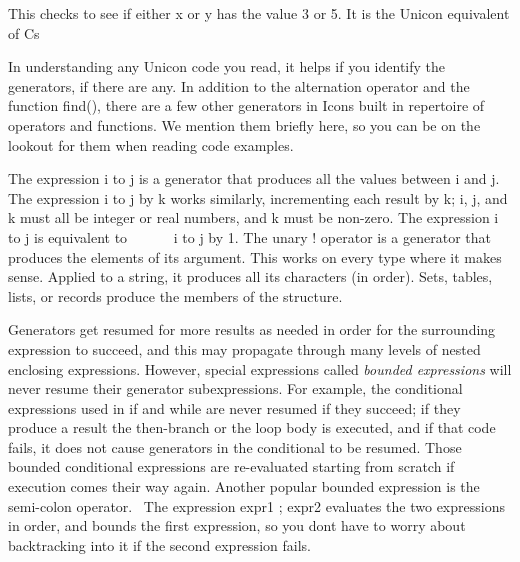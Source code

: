 
This checks to see if either \textsf{x} or \textsf{y} has the value 3 or
5. It is the Unicon equivalent of C{\textquotesingle}s


In understanding any Unicon code you read, it helps if you identify the
generators, if there are any. In addition to the alternation operator
\textsf{{\textbar}} and the function \textsf{find()}, there are a few
other generators in Icon{\textquotesingle}s built in repertoire of
operators and functions. We mention them briefly here, so you can be on
the lookout for them when reading code examples.

The expression \textsf{i }\textsf{to j} is a
generator that produces all the values between \textsf{i} and
\textsf{j.} The expression \textsf{i to j }\textsf{by k} works similarly, incrementing each result by
\textsf{k}; \textsf{i}, \textsf{j}, and \textsf{k} must all be integer
or real numbers, and \textsf{k} must be non-zero. The expression
\textsf{i to j} is equivalent to \ \ \ \ \ \ \textsf{i to j by 1}. The
unary \textsf{!} operator is a generator
that produces the elements of its argument. This works on every type
where it makes sense. Applied to a string, it produces all its
characters (in order). Sets, tables, lists, or records produce the
members of the structure.

Generators get resumed for more results as needed in order for the
surrounding expression to succeed, and this may propagate through many
levels of nested enclosing expressions. However, special expressions
called \textit{bounded expressions} will
never resume their generator subexpressions. For example, the
conditional expressions used in \textsf{if} and \textsf{while} are
never resumed if they succeed; if they produce a result the then-branch
or the loop body is executed, and if that code fails, it does not cause
generators in the conditional to be resumed. Those bounded conditional
expressions are re-evaluated starting from scratch if execution comes
their way again. Another popular bounded expression is the semi-colon
operator. \ The expression \textsf{expr1 ; expr2 }evaluates the two
expressions in order, and bounds the first expression, so you
don{\textquotesingle}t have to worry about backtracking into it if the
second expression fails.

